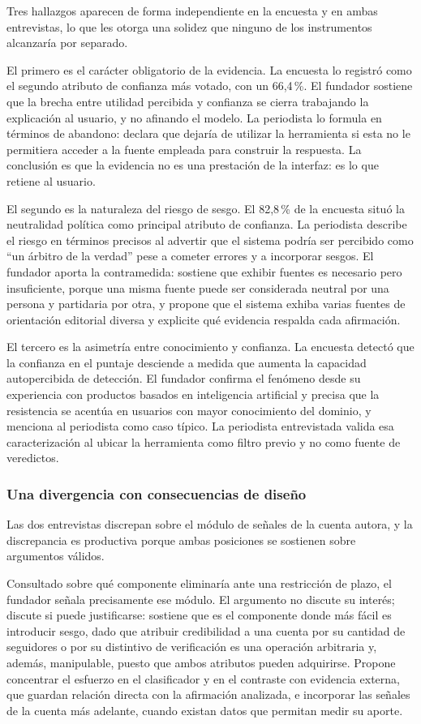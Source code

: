 Tres hallazgos aparecen de forma independiente en la encuesta y en ambas entrevistas, lo que les otorga una solidez que ninguno de los instrumentos alcanzaría por separado.

El primero es el carácter obligatorio de la evidencia. La encuesta lo registró como el segundo atributo de confianza más votado, con un 66,4\,\%. El fundador sostiene que la brecha entre utilidad percibida y confianza se cierra trabajando la explicación al usuario, y no afinando el modelo. La periodista lo formula en términos de abandono: declara que dejaría de utilizar la herramienta si esta no le permitiera acceder a la fuente empleada para construir la respuesta. La conclusión es que la evidencia no es una prestación de la interfaz: es lo que retiene al usuario.

El segundo es la naturaleza del riesgo de sesgo. El 82,8\,\% de la encuesta situó la neutralidad política como principal atributo de confianza. La periodista describe el riesgo en términos precisos al advertir que el sistema podría ser percibido como \enquote{un árbitro de la verdad} pese a cometer errores y a incorporar sesgos. El fundador aporta la contramedida: sostiene que exhibir fuentes es necesario pero insuficiente, porque una misma fuente puede ser considerada neutral por una persona y partidaria por otra, y propone que el sistema exhiba varias fuentes de orientación editorial diversa y explicite qué evidencia respalda cada afirmación.

El tercero es la asimetría entre conocimiento y confianza. La encuesta detectó que la confianza en el puntaje desciende a medida que aumenta la capacidad autopercibida de detección. El fundador confirma el fenómeno desde su experiencia con productos basados en inteligencia artificial y precisa que la resistencia se acentúa en usuarios con mayor conocimiento del dominio, y menciona al periodista como caso típico. La periodista entrevistada valida esa caracterización al ubicar la herramienta como filtro previo y no como fuente de veredictos.

\subsubsection{Una divergencia con consecuencias de diseño}

Las dos entrevistas discrepan sobre el módulo de señales de la cuenta autora, y la discrepancia es productiva porque ambas posiciones se sostienen sobre argumentos válidos.

Consultado sobre qué componente eliminaría ante una restricción de plazo, el fundador señala precisamente ese módulo. El argumento no discute su interés; discute si puede justificarse: sostiene que es el componente donde más fácil es introducir sesgo, dado que atribuir credibilidad a una cuenta por su cantidad de seguidores o por su distintivo de verificación es una operación arbitraria y, además, manipulable, puesto que ambos atributos pueden adquirirse. Propone concentrar el esfuerzo en el clasificador y en el contraste con evidencia externa, que guardan relación directa con la afirmación analizada, e incorporar las señales de la cuenta más adelante, cuando existan datos que permitan medir su aporte.

